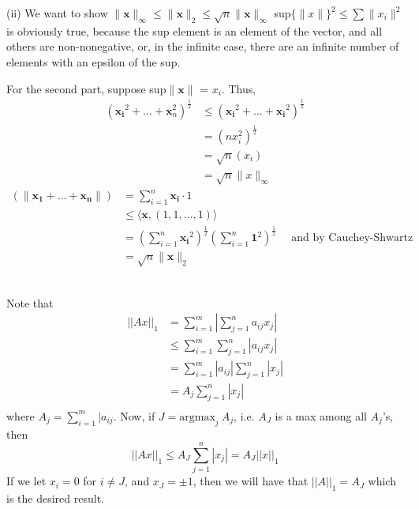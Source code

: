 \documentclass[letterpaper,12pt]{article}
\theoremstyle{definition}
\begin{document}
(ii)
We want to show $\|\mathbf{x}\|_{\infty} \leq \|\mathbf{x}\|_2 \leq \sqrt{n} \|\mathbf{x}\|_{\infty}$
sup$\{\|x\|\}^2 \leq \sum \|x_i\|^2 $ is obviously true, because the sup element is an element of the vector, and all others are non-nonegative, or, in the infinite case, there
are an infinite number of elements with an epsilon of the sup.

For the second part, suppose sup{$\|\mathbf{x}\|$} = $x_i$. Thus,
\begin{align*}
    (\mathbf{x_i}^2 + \dots + \mathbf{x}_n ^2)^{\frac{1}{2}} & \leq (\mathbf{x_i}^2+ \dots + \mathbf{x_i}^2)^{\frac{1}{2}}\\
    & = (n x_i^2)^{\frac{1}{2}}\\
    & = \sqrt{n} (x_i) \\
    & = \sqrt{n} \|x\|_{\infty}
\end{align*}
\begin{align*}
    (\|\mathbf{x_1} + \dots + \mathbf{x_n} \|) & = \sum_{i=1}^n \mathbf{x_i} \cdot 1 \\
    & \leq \langle \mathbf{x}, (1,1,\dots,1) \rangle  \\
    & = (\sum_{i=1}^n \mathbf{x_i}^2)^{\frac{1}{2}} (\sum_{i=1}^n \mathbf{1}^2)^{\frac{1}{2}} \quad \text{ and by Cauchey-Shwartz} \\
    & = \sqrt{n} \|\mathbf{x}\|_2
\end{align*}

\\
Note that 
\begin{align*}
        ||Ax||_1 &= \sum^{m}_{i=1} | \sum^{n}_{j=1} a_{ij} x_j| \\
            &\leq \sum^{m}_{i=1} \sum^{n}_{j=1} |a_{ij} x_j| \\
                &= \sum^{m}_{i=1}|a_{ij}| \sum^{n}_{j=1}  |x_j| \\
                    &= A_j \sum^{n}_{j=1}  |x_j| \\
                \end{align*}
                where $A_j = \sum^{m}_{i=1} |a_{ij}$. Now, if $J = \text{argmax}_j ~ A_j$, i.e. $A_J$ is a max among all $A_j$'s, then 
                \[||Ax||_1 \leq A_J \sum^{n}_{j=1} |x_j| = A_J ||x||_1\]
                If we let $x_i = 0$ for $i \neq J$, and $x_J =  \pm 1$, then we will have that $||A||_1 = A_J$ which is the desired result.
\end{document}

